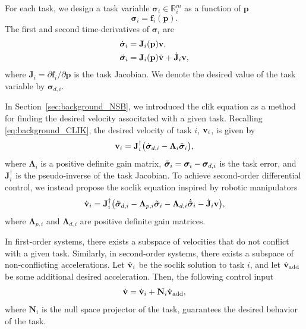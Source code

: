 For each task, we design a task variable $\bm{\sigma}_i \in \mathbb{R}^m_i$ as a function of $\mathbf{p}$
\begin{equation}
    \bm{\sigma}_i = \mathbf{f}_i(\mathbf{p}).
\end{equation}
The first and second time-derivatives of $\bm{\sigma}_i$ are
\begin{subequations}\label{eq:task_derivatives}
    \begin{align}
        \dot{\bm{\sigma}}_i &= \mathbf{J}_i(\mathbf{p})\mathbf{v},\\
        \ddot{\bm{\sigma}}_i &= \mathbf{J}_i(\mathbf{p})\dot{\mathbf{v}} + \dot{\mathbf{J}}_i \mathbf{v},\label{eq:task_second_derivative}
    \end{align}
\end{subequations}
where $\mathbf{J}_i = \partial \mathbf{f}_i/\partial \mathbf{p}$ is the task Jacobian. We denote the desired value of the task variable by $\bm{\sigma}_{d, i}$.

In Section~\ref{sec:background_NSB}, we introduced the \acrfull{clik} equation as a method for finding the desired velocity associtated with a given task.
Recalling \eqref{eq:background_CLIK}, the desired velocity of task $i$, $\mathbf{v}_i$, is given by
\begin{equation}
    \mathbf{v}_i = \mathbf{J}_i^\dagger\bigl(\dot{\bm{\sigma}}_{d, i} - \bm{\Lambda}_i \Tilde{\bm{\sigma}}_i\bigr),
\end{equation}
where $\bm{\Lambda}_i$ is a positive definite gain matrix, $\Tilde{\bm{\sigma}}_i = \bm{\sigma}_i - \bm{\sigma}_{d,i}$ is the task error, and $\mathbf{J}_i^\dagger$ is the pseudo-inverse of the task Jacobian. 
To achieve second-order differential control, we instead propose the \gls{soclik} equation inspired by robotic manipulators \cite{siciliano_closed-loop_1990}
\begin{equation}
    \dot{\mathbf{v}}_i = \mathbf{J}_i^\dagger \bigl(\ddot{\bm{\sigma}}_{d,i} - \mathbf{\Lambda}_{p,i}\Tilde{\bm{\sigma}}_i - \mathbf{\Lambda}_{d,i} \dot{\Tilde{\bm{\sigma}}}_i - \dot{\mathbf{J}}_i \mathbf{v}\bigr), \label{eq:general_acceleration}
\end{equation}
where $\mathbf{\Lambda}_{p,i}$ and $\mathbf{\Lambda}_{d,i}$ are positive definite gain matrices.

In first-order systems, there exists a subspace of velocities that do not conflict with a given task.
Similarly, in second-order systems, there exists a subspace of non-conflicting accelerations.
Let $\dot{\mathbf{v}}_i$ be the \gls{soclik} solution to task $i$, and let $\dot{\mathbf{v}}_{\rm add}$ be some additional desired acceleration.
Then, the following control input
\begin{equation}
    \dot{\mathbf{v}} = \dot{\mathbf{v}}_i +\mathbf{N}_i \dot{\mathbf{v}}_{\rm add},
    \label{eq:NSB_two_tasks}
\end{equation}
where $\mathbf{N}_i$ is the null space projector of the task, guarantees the desired behavior of the task.

